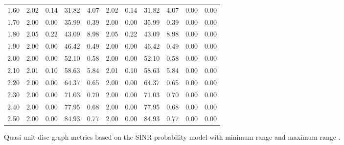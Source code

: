 \documentclass{article}
\begin{document}
\begin{figure}[h]
\begin{center}
\begin{tabular}{|r|rr|rr|rr|rr|rr|}
1.60 & 2.02 & 0.14 & 31.82 & 4.07 & 2.02 & 0.14 & 31.82 & 4.07 & 0.00 & 0.00\\
1.70 & 2.00 & 0.00 & 35.99 & 0.39 & 2.00 & 0.00 & 35.99 & 0.39 & 0.00 & 0.00\\
1.80 & 2.05 & 0.22 & 43.09 & 8.98 & 2.05 & 0.22 & 43.09 & 8.98 & 0.00 & 0.00\\
1.90 & 2.00 & 0.00 & 46.42 & 0.49 & 2.00 & 0.00 & 46.42 & 0.49 & 0.00 & 0.00\\
2.00 & 2.00 & 0.00 & 52.10 & 0.58 & 2.00 & 0.00 & 52.10 & 0.58 & 0.00 & 0.00\\
2.10 & 2.01 & 0.10 & 58.63 & 5.84 & 2.01 & 0.10 & 58.63 & 5.84 & 0.00 & 0.00\\
2.20 & 2.00 & 0.00 & 64.37 & 0.65 & 2.00 & 0.00 & 64.37 & 0.65 & 0.00 & 0.00\\
2.30 & 2.00 & 0.00 & 71.03 & 0.70 & 2.00 & 0.00 & 71.03 & 0.70 & 0.00 & 0.00\\
2.40 & 2.00 & 0.00 & 77.95 & 0.68 & 2.00 & 0.00 & 77.95 & 0.68 & 0.00 & 0.00\\
2.50 & 2.00 & 0.00 & 84.93 & 0.77 & 2.00 & 0.00 & 84.93 & 0.77 & 0.00 & 0.00\\
\hline
\end{tabular}
\caption{Quasi unit disc graph metrics based on the SINR probability model with minimum range  and maximum range .}
\label{exp_quasi}
\end{center}
\end{figure}
\end{document}
